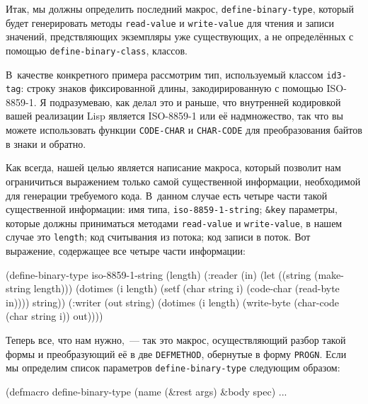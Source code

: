 Итак, мы должны определить последний макрос, \lstinline{define-binary-type}, который будет
генерировать методы \lstinline{read-value} и \lstinline{write-value} для чтения и записи значений,
предствляющих экземпляры уже существующих, а не определённых с помощью
\lstinline{define-binary-class}, классов.

В~качестве конкретного примера рассмотрим тип, используемый классом \lstinline{id3-tag}: строку
знаков фиксированной длины, закодирированную с помощью ISO-8859-1. Я подразумеваю, как
делал это и раньше, что внутренней кодировкой вашей реализации Lisp является ISO-8859-1
или её надмножество, так что вы можете использовать функции \lstinline{CODE-CHAR} и
\lstinline{CHAR-CODE} для преобразования байтов в знаки и обратно.

Как всегда, нашей целью является написание макроса, который позволит нам ограничиться
выражением только самой существенной информации, необходимой для генерации требуемого
кода. В~данном случае есть четыре части такой существенной информации: имя типа,
\lstinline{iso-8859-1-string}; \lstinline!&key! параметры, которые должны приниматься методами
\lstinline{read-value} и \lstinline{write-value}, в нашем случае это \lstinline{length}; код считывания
из потока; код записи в поток. Вот выражение, содержащее все четыре части информации:

\begin{myverb}
(define-binary-type iso-8859-1-string (length)
  (:reader (in)
    (let ((string (make-string length)))
      (dotimes (i length)
        (setf (char string i) (code-char (read-byte in))))
      string))
  (:writer (out string)
    (dotimes (i length)
      (write-byte (char-code (char string i)) out))))
\end{myverb}

Теперь все, что нам нужно,~--- так это макрос, осуществляющий разбор такой формы и
преобразующий её в две \lstinline{DEFMETHOD}, обернутые в форму \lstinline{PROGN}. Если мы
определим список параметров \lstinline{define-binary-type} следующим образом:

\begin{myverb}
(defmacro define-binary-type (name (&rest args) &body spec) ...
\end{myverb}

